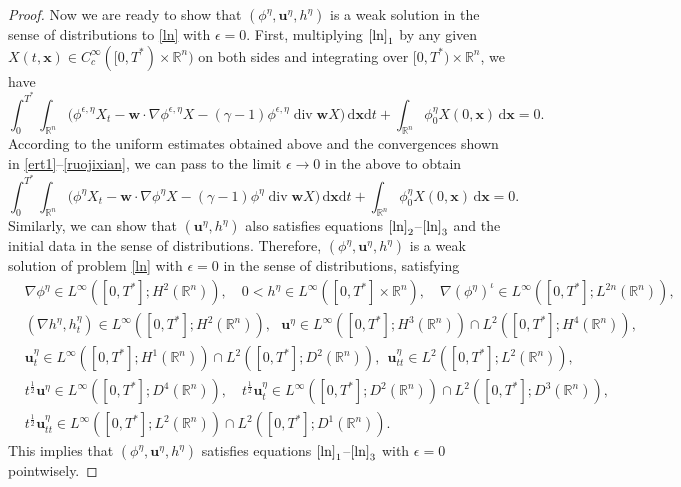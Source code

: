 \documentclass[11pt,reqno]{amsart}
\DeclareMathOperator{\diver}{\mathrm{div}}
\numberwithin{rk}{section}
\numberwithin{prop}{section}
\numberwithin{mydef}{section}
\numberwithin{lem}{section}
\numberwithin{equation}{section}
\numberwithin{thm}{section}
\begin{document}
\begin{proof}
Now we are ready to show that $(\phi^\eta,  \boldsymbol{u}^\eta, h^\eta) $ is a weak solution in the sense of distributions to  \eqref{ln} with  $\epsilon=0$.
First, multiplying $\eqref{ln}_1$ by  any given  $X(t,\boldsymbol{x})\in C^\infty_c ([0,T^*)\times \mathbb{R}^n)$ on both sides and integrating over $[0,T^*)\times \mathbb{R}^n$, we have
\begin{equation*} 
\int_0^{T^*} \int_{\mathbb{R}^n}  \Big(\phi^{\epsilon,\eta} X_t-\boldsymbol{w}\cdot\nabla\phi^{\epsilon,\eta}X-(\gamma-1)\phi^{\epsilon,\eta} \diver\boldsymbol{w}X\Big)\,\mathrm{d}\boldsymbol{x}\mathrm{d}t+ \int_{\mathbb{R}^n}  \phi_0^{\eta} X(0,\boldsymbol{x})\,\mathrm{d}\boldsymbol{x}=0.
\end{equation*}
According to   the  uniform estimates obtained above and  the convergences shown in \eqref{ert1}--\eqref{ruojixian}, we  can pass to the  limit  $\epsilon \to 0$ in the above to obtain 
\begin{equation*}
\int_0^{T^*} \int_{\mathbb{R}^n}  \Big(\phi^{\eta} X_t-\boldsymbol{w}\cdot\nabla\phi^{\eta}X-(\gamma-1)\phi^{\eta} \diver\boldsymbol{w}X\Big)\,\mathrm{d}\boldsymbol{x}\mathrm{d}t+ \int_{\mathbb{R}^n}  \phi_0^{\eta} X(0,\boldsymbol{x})\,\mathrm{d}\boldsymbol{x}=0.
\end{equation*}
Similarly, we can show that $(\boldsymbol{u}^\eta,h^\eta)$ also satisfies equations $\eqref{ln}_2$--$\eqref{ln}_3$ and the initial data in the sense of distributions. Therefore, $(\phi^\eta,  \boldsymbol{u}^\eta,  h^\eta) $ is a weak solution of  problem \eqref{ln} with  $\epsilon=0$ in the sense of distributions, satisfying  
\begin{equation*}\label{zheng}
\begin{aligned}
&\nabla \phi^\eta\in L^\infty([0,T^*]; H^2(\mathbb{R}^n)), \quad 0<h^\eta\in L^\infty([0,T^*]\times \mathbb{R}^n),\quad \nabla(\phi^\eta)^\iota\in L^\infty([0,T^*]; L^{2n}(\mathbb{R}^n)),\\
&(\nabla h^\eta, h^\eta_t)\in L^\infty([0,T^*];H^2(\mathbb{R}^n)), \  \ \ \boldsymbol{u}^\eta\in L^\infty([0,T^*]; H^3(\mathbb{R}^n))\cap L^2([0,T^*]; H^4(\mathbb{R}^n)), \\
&\boldsymbol{u}^\eta_t \in L^\infty([0,T^*]; H^1(\mathbb{R}^n))\cap L^2([0,T^*]; D^2(\mathbb{R}^n)),\ \   \boldsymbol{u}^\eta_{tt}\in L^2([0,T^*];L^2(\mathbb{R}^n)),\\
&t^{\frac{1}{2}}\boldsymbol{u}^\eta\in L^\infty([0,T^*];D^4(\mathbb{R}^n)),\quad   t^{\frac{1}{2}}\boldsymbol{u}^\eta_t\in L^\infty([0,T^*];D^2(\mathbb{R}^n))\cap L^2([0,T^*]; D^3(\mathbb{R}^n)),\\
&t^{\frac{1}{2}}\boldsymbol{u}^\eta_{tt}\in L^\infty([0,T^*];L^2(\mathbb{R}^n))\cap L^2([0,T^*];D^1(\mathbb{R}^n)).
\end{aligned}
\end{equation*}
This implies that $(\phi^\eta,\boldsymbol{u}^\eta,h^\eta)$  satisfies equations $\eqref{ln}_1$--$\eqref{ln}_3$  with $\epsilon=0$ pointwisely.
\smallskip


\end{proof}
\end{document}
